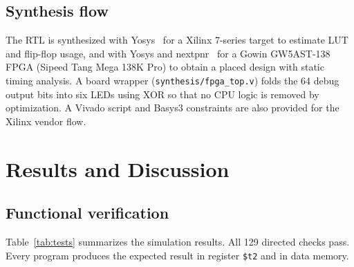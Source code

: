 \documentclass[conference]{IEEEtran}
\begin{document}
\subsection{Synthesis flow}
The RTL is synthesized with Yosys~\cite{yosys} for a Xilinx 7-series target to
estimate LUT and flip-flop usage, and with Yosys and nextpnr~\cite{shah2019yosys}
for a Gowin GW5AST-138 FPGA (Sipeed Tang Mega 138K Pro) to obtain a placed
design with static timing analysis. A board wrapper
(\texttt{synthesis/fpga\_top.v}) folds the 64 debug output bits into six LEDs
using XOR so that no CPU logic is removed by optimization. A Vivado script and
Basys3 constraints are also provided for the Xilinx vendor flow.

\section{Results and Discussion}

\subsection{Functional verification}
Table~\ref{tab:tests} summarizes the simulation results. All 129 directed
checks pass. Every program produces the expected result in register
\texttt{\$t2} and in data memory.

\begin{table}[!tbp]
\caption{Simulation results (Icarus Verilog 13.0)}
\label{tab:tests}
\centering
\footnotesize
{}
\end{table}
\end{document}
